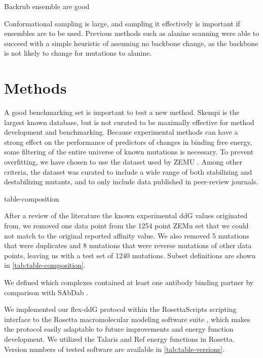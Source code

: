 Backrub ensemble are good \cite{schenkelberg_protein_2016}

Conformational sampling is large, and sampling it effectively is important if ensembles are to be used. Previous methods such as alanine scanning were able to succeed with a simple heuristic of assuming no backbone change, as the backbone is not likely to change for mutations to alanine.

\section{Methods}

A good benchmarking set is important to test a new method. Skempi \cite{moal_skempi:_2012} is the largest known database, but is not curated to be maximally effective for method development and benchmarking. Because experimental methods can have a strong effect on the performance of predictors of changes in binding free energy\cite{geng_exploring_2016}, some filtering of the entire universe of known mutations is necessary. To prevent overfitting, we have chosen to use the dataset used by ZEMU \cite{dourado_multiscale_2014}. Among other criteria, the dataset was curated to include a wide range of both stabilizing and destabilizing mutants, and to only include data published in peer-review journals.

{table-composition}

After a review of the literature the known experimental ddG values originated from, we removed one data point from the 1254 point ZEMu set that we could not match to the original reported affinity value. We also removed 5 mutations that were duplicates and 8 mutations that were reverse mutations of other data points, leaving us with a test set of 1240 mutations. Subset definitions are shown in \cref{tab:table-composition}.

We defined which complexes contained at least one antibody binding partner by comparison with SAbDab \cite{dunbar_sabdab:_2014}.

We implemented our flex-ddG protocol within the RosettaScripts scripting interface to the Rosetta macromolecular modeling software suite \cite{fleishman_rosettascripts:_2011}, which makes the protocol easily adaptable to future improvements and energy function development. We utilized the Talaris \cite{leaver-fay_chapter_2013,song_structure-guided_2011,shapovalov_smoothed_2011} and Ref\cite{alford_rosetta_2017} energy functions in Rosetta. Version numbers of tested software are available in \cref{tab:table-versions}.

